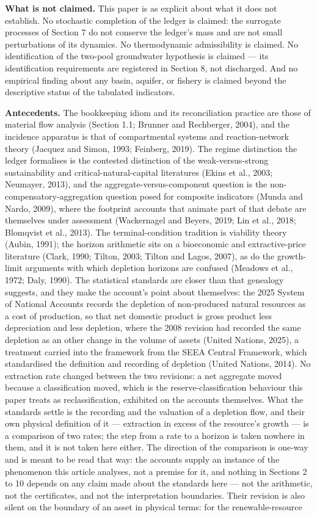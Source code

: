 \documentclass[11pt]{article}
\begin{document}
\textbf{What is not claimed.} This paper is as explicit about what it does not establish. No stochastic completion of the ledger is claimed: the surrogate processes of Section 7 do not conserve the ledger's mass and are not small perturbations of its dynamics. No thermodynamic admissibility is claimed. No identification of the two-pool groundwater hypothesis is claimed --- its identification requirements are registered in Section 8, not discharged. And no empirical finding about any basin, aquifer, or fishery is claimed beyond the descriptive status of the tabulated indicators.

\textbf{Antecedents.} The bookkeeping idiom and its reconciliation practice are those of material flow analysis (Section 1.1; Brunner and Rechberger, 2004), and the incidence apparatus is that of compartmental systems and reaction-network theory (Jacquez and Simon, 1993; Feinberg, 2019). The regime distinction the ledger formalises is the contested distinction of the weak-versus-strong sustainability and critical-natural-capital literatures (Ekins et al., 2003; Neumayer, 2013), and the aggregate-versus-component question is the non-compensatory-aggregation question posed for composite indicators (Munda and Nardo, 2009), where the footprint accounts that animate part of that debate are themselves under assessment (Wackernagel and Beyers, 2019; Lin et al., 2018; Blomqvist et al., 2013). The terminal-condition tradition is viability theory (Aubin, 1991); the horizon arithmetic sits on a bioeconomic and extractive-price literature (Clark, 1990; Tilton, 2003; Tilton and Lagos, 2007), as do the growth-limit arguments with which depletion horizons are confused (Meadows et al., 1972; Daly, 1990). The statistical standards are closer than that genealogy suggests, and they make the account's point about themselves: the 2025 System of National Accounts records the depletion of non-produced natural resources as a cost of production, so that net domestic product is gross product less depreciation and less depletion, where the 2008 revision had recorded the same depletion as an other change in the volume of assets (United Nations, 2025), a treatment carried into the framework from the SEEA Central Framework, which standardised the definition and recording of depletion (United Nations, 2014). No extraction rate changed between the two revisions: a net aggregate moved because a classification moved, which is the reserve-classification behaviour this paper treats as reclassification, exhibited on the accounts themselves. What the standards settle is the recording and the valuation of a depletion flow, and their own physical definition of it --- extraction in excess of the resource's growth --- is a comparison of two rates; the step from a rate to a horizon is taken nowhere in them, and it is not taken here either. The direction of the comparison is one-way and is meant to be read that way: the accounts supply an instance of the phenomenon this article analyses, not a premise for it, and nothing in Sections 2 to 10 depends on any claim made about the standards here --- not the arithmetic, not the certificates, and not the interpretation boundaries. Their revision is also silent on the boundary of an asset in physical terms: for the renewable-resource 
\end{document}
